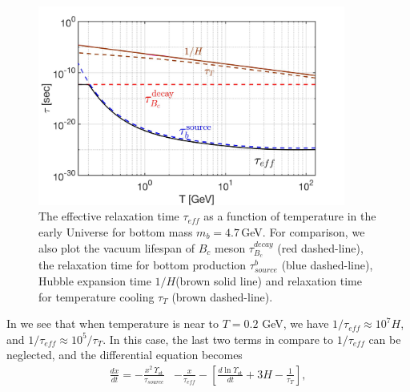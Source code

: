\begin{figure} 
\centerline{\includegraphics[width=0.9\textwidth]{./plots/Tau_RelaxationTime002}}
\caption{The effective relaxation time $\tau_{eff}$ as a function of temperature in the early Universe for bottom mass $m_b=4.7$\,GeV.  For comparison, we also plot the vacuum lifespan of $B_c$ meson $\tau_{B_c}^{decay}$ (red dashed-line), the relaxation time for bottom production $\tau^b_{source}$ (blue dashed-line), Hubble expansion time $1/H$(brown solid line) and relaxation time for temperature cooling $\tau_T$ (brown dashed-line). }
\label{RelaxationTime_eff}
\end{figure}

In  we see that when temperature is near to $T=0.2$ GeV, we have $1/\tau_{eff}\approx10^{7}H$, and $1/\tau_{eff}\approx10^5/\tau_T$. In this case, the last two terms in  compare to $1/\tau_{eff}$ can be neglected, and the differential equation becomes
\begin{align}\label{nonstationary_eq}
\frac{dx}{dt}=-\frac{x^2\,\Upsilon_\mathrm{st}}{\tau_{source}}&-\frac{x}{\tau_{eff}}-\left[\frac{d\ln\Upsilon_\mathrm{st}}{dt}+3H-\frac{1}{\tau_T}\right],
\end{align}


